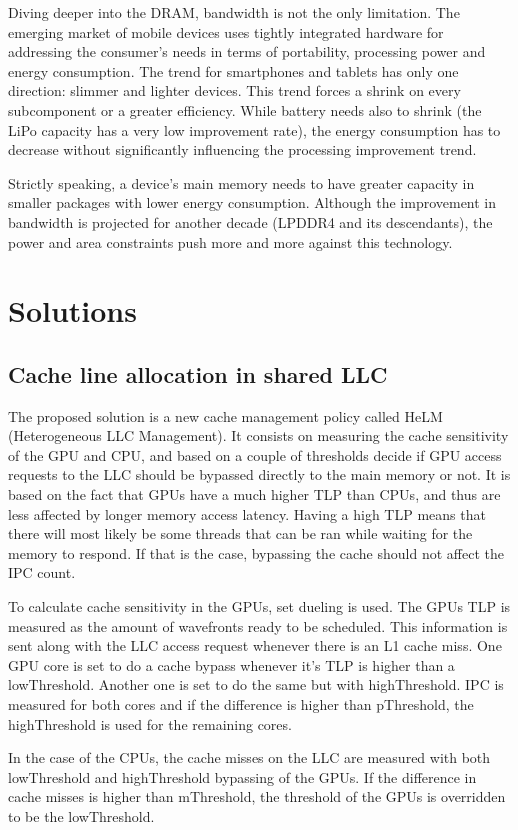\documentclass[12pt,journal,compsoc]{IEEEtran}
\begin{document}
Diving deeper into the DRAM, bandwidth is not the only limitation. The emerging market of mobile devices uses tightly integrated hardware for addressing the consumer's needs in terms of portability, processing power and energy consumption. The trend for smartphones and tablets has only one direction: slimmer and lighter devices. This trend forces a shrink on every subcomponent or a greater efficiency. While battery needs also to shrink (the LiPo capacity has a very low improvement rate), the energy consumption has to decrease without significantly influencing the processing improvement trend. 

Strictly speaking, a device's main memory needs to have greater capacity in smaller packages with lower energy consumption. Although the improvement in bandwidth is projected for another decade (LPDDR4 and its descendants), the power and area constraints push more and more against this technology.

\section{Solutions}
\subsection{Cache line allocation in shared LLC}
The proposed solution is a new cache management policy called HeLM (Heterogeneous LLC Management). It consists on measuring the cache sensitivity of the GPU and CPU, and based on a couple of thresholds decide if GPU access requests to the LLC should be bypassed directly to the main memory or not.
It is based on the fact that GPUs have a much higher TLP than CPUs, and thus are less affected by longer memory access latency. Having a high TLP means that there will most likely be some threads that can be ran while waiting for the memory to respond. If that is the case, bypassing the cache should not affect the IPC count.


To calculate cache sensitivity in the GPUs, set dueling is used. The GPUs TLP is measured as the amount of wavefronts ready to be scheduled. This information is sent along with the LLC access request whenever there is an L1 cache miss. One GPU core is set to do a cache bypass whenever it's TLP is higher than a lowThreshold. Another one is set to do the same but with highThreshold. IPC is measured for both cores and if the difference is higher than pThreshold, the highThreshold is used for the remaining cores.

In the case of the CPUs, the cache misses on the LLC are measured with both lowThreshold and highThreshold bypassing of the GPUs. If the difference in cache misses is higher than mThreshold, the threshold of the GPUs is overridden to be the lowThreshold.
\end{document}
